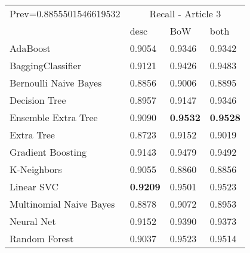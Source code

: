 \begin{tabular}{|l|l|l|l| }
\hline
Prev=0.8855501546619532 &  \multicolumn{3}{c|}{Recall - Article 3} \\
\cline{2-4} & desc & BoW & both \\ \hline
AdaBoost                & 0.9054 & 0.9346 & 0.9342\\
BaggingClassifier       & 0.9121 & 0.9426 & 0.9483\\
Bernoulli Naive Bayes   & 0.8856 & 0.9006 & 0.8895\\
Decision Tree           & 0.8957 & 0.9147 & 0.9346\\
Ensemble Extra Tree     & 0.9090 & {\bf 0.9532} & {\bf 0.9528}\\
Extra Tree              & 0.8723 & 0.9152 & 0.9019\\
Gradient Boosting       & 0.9143 & 0.9479 & 0.9492\\
K-Neighbors             & 0.9055 & 0.8860 & 0.8856\\
Linear SVC              & {\bf 0.9209} & 0.9501 & 0.9523\\
Multinomial Naive Bayes & 0.8878 & 0.9072 & 0.8953\\
Neural Net              & 0.9152 & 0.9390 & 0.9373\\
Random Forest           & 0.9037 & 0.9523 & 0.9514\\
\hline
\end{tabular}
